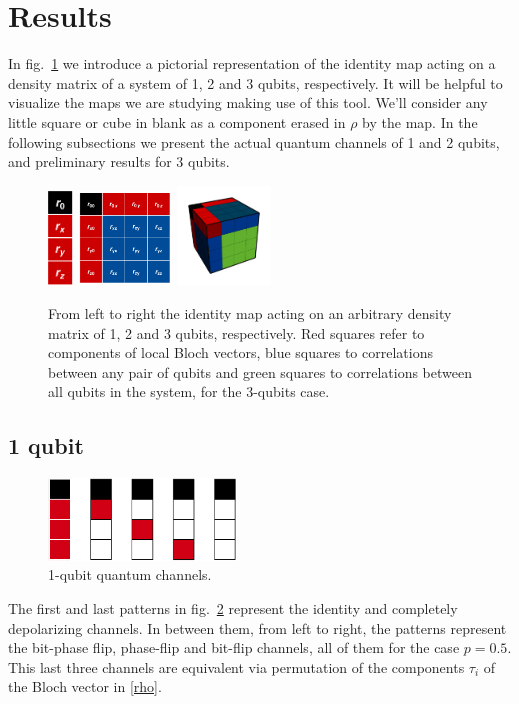 \documentclass[11pt,dvipsnames]{article} %
\newcommand{\fref}[1]{fig.~\ref{#1}}  \newcommand{\tref}[1]{table~\ref{#1}}
\newcommand{\1}{\mathds{1}}
\begin{document}
\section*{Results} %
In \fref{fig:pictorial-rep-rho} we introduce a pictorial representation 
of the identity map acting on a density matrix of a system of 1, 2 and 3 qubits,
respectively. It will be helpful to visualize the maps we are studying 
making use of this tool. We'll consider any little square or cube in blank
as a component erased in $\rho$ by the map. 
In the following subsections we present the actual quantum channels of
1 and 2 qubits, and preliminary results for 3 qubits.
\begin{figure}[H] %
	\centering
	\hfill \hfill
	\includegraphics[height=2.5cm]
	{img/tablero-1q}
	\hfill
	\includegraphics[width=2.5cm]
	{img/rho2q(2)}
	\hfill 
	\includegraphics[width=2.5cm]
	{img/rho-3q}
	\hfill \hfill
	\caption{From left to right the identity map acting on
  an arbitrary density matrix of 1, 2 and 3 qubits, respectively. 
	Red squares refer to components of local Bloch vectors,
	blue squares to correlations between any pair of qubits and
	green squares to correlations between all qubits in the system, for
	the 3-qubits case. }
	\label{fig:pictorial-rep-rho}
\end{figure} %
\subsection*{1 qubit} %
\begin{figure}[H]%
	\centering
	\includegraphics[width=5cm]
	{img/1q-CCs.png}
	\caption{ 1-qubit 
quantum channels.
}
	\label{fig:1q-ccs}
\end{figure} %
The first and last patterns in \fref{fig:1q-ccs} represent the identity 
and completely depolarizing channels. 
In between them, from left to right, the patterns represent 
the bit-phase flip, phase-flip and bit-flip channels, 
all of them for the case $p=0.5$.	
This last three channels are equivalent via permutation
of the components $\tau_i$ of the Bloch vector in \eqref{rho}.
\end{document}
